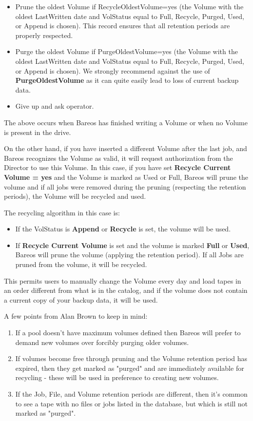 \begin{itemize}
\item Prune the oldest Volume if RecycleOldestVolume=yes (the Volume with the
   oldest LastWritten date and VolStatus equal to  Full, Recycle, Purged, Used,
   or Append is chosen). This  record ensures that all retention periods are
   properly respected.
\item Purge the oldest Volume if PurgeOldestVolume=yes (the Volume  with the
   oldest LastWritten date and VolStatus equal to  Full, Recycle, Purged, Used,
   or Append is chosen). We strongly  recommend against the use of {\bf
   PurgeOldestVolume} as it can quite easily lead to loss of current backup
   data.
\item Give up and ask operator.
\end{itemize}

The above occurs when Bareos has finished writing a Volume or when no Volume
is present in the drive.

On the other hand, if you have inserted a different Volume after the last job,
and Bareos recognizes the Volume as valid, it will request authorization from
the Director to use this Volume. In this case, if you have set {\bf Recycle
Current Volume = yes} and the Volume is marked as Used or Full, Bareos will
prune the volume and if all jobs were removed during the pruning (respecting
the retention periods), the Volume will be recycled and used.

The recycling algorithm in this case is:
\begin{itemize}
\item If the VolStatus is {\bf Append} or {\bf Recycle}
   is set, the volume  will be used.
\item If {\bf Recycle Current Volume} is set and the  volume is marked {\bf
   Full} or {\bf Used}, Bareos  will prune the volume (applying the retention
   period).  If all Jobs are pruned from the volume, it will be  recycled.
\end{itemize}

This permits users to manually change the Volume every day and load tapes in
an order different from what is in the catalog, and if the volume does not
contain a current copy of your backup data, it will be used.

A few points from Alan Brown to keep in mind:

\begin{enumerate}
\item If a pool doesn't have maximum volumes defined then Bareos will prefer to
  demand new volumes over forcibly purging older volumes.

\item If volumes become free through pruning and the Volume retention period has
  expired, then they get marked as "purged" and are immediately available for
  recycling - these will be used in preference to creating new volumes.

\item If the Job, File, and Volume retention periods are different, then
  it's common to see a tape with no files or jobs listed in the database,
  but which is still not marked as "purged".
\end{enumerate}



